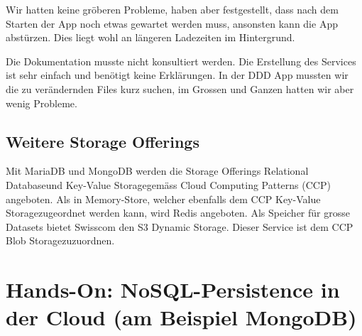 Wir hatten keine gröberen Probleme, haben aber festgestellt, dass nach dem Starten der App noch etwas gewartet werden muss, ansonsten kann die App abstürzen. Dies liegt wohl an längeren Ladezeiten im Hintergrund. 

Die Dokumentation musste nicht konsultiert werden. Die Erstellung des Services ist sehr einfach und benötigt keine Erklärungen. In der DDD App mussten wir die zu verändernden Files kurz suchen, im Grossen und Ganzen hatten wir aber wenig Probleme.

\section{Weitere Storage Offerings}
Mit MariaDB und MongoDB werden die Storage Offerings \glqq Relational Database\grqq und \glqq Key-Value Storage\grqq gemäss Cloud Computing Patterns (CCP) angeboten. Als in Memory-Store, welcher ebenfalls dem CCP \glqq Key-Value Storage\grqq zugeordnet werden kann, wird Redis angeboten. Als Speicher für grosse Datasets bietet Swisscom den \glqq S3 Dynamic Storage\grqq . Dieser Service ist dem CCP \glqq Blob Storage\grqq zuzuordnen.

\chapter{Hands-On: NoSQL-Persistence in der Cloud (am Beispiel MongoDB)} %
